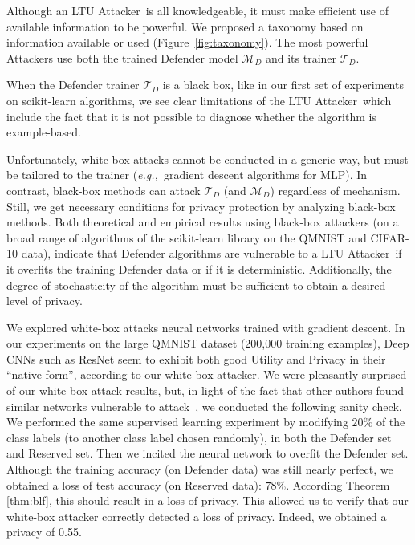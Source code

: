 \documentclass[letterpaper]{article}
\newcommand{\eg}{{\em e.g.,~}}
\newcommand{\oracle}{LTU Attacker~}
\begin{document}
Although an \oracle is all knowledgeable, it must make efficient use of available information to be powerful. We proposed a taxonomy
based on information available or used (Figure~\ref{fig:taxonomy}). The most powerful Attackers use both the trained Defender model $\mathcal{M}_D$ and its trainer $\mathcal{T}_D$.

When the Defender trainer $\mathcal{T}_D$ is a black box, like in our first set of experiments on scikit-learn algorithms, we see clear limitations of the \oracle which include the fact that it is not possible to diagnose whether the algorithm is example-based.

Unfortunately, white-box attacks cannot be conducted in a generic way, but must be tailored to the trainer (\eg  gradient descent algorithms for MLP). In contrast, black-box methods can attack $\mathcal{T}_D$ (and $\mathcal{M}_D$) regardless of mechanism. Still, we get necessary conditions for privacy protection by analyzing black-box methods. Both theoretical and empirical results using black-box attackers (on a broad range of algorithms of the scikit-learn library on the QMNIST and CIFAR-10 data),
indicate that Defender algorithms are vulnerable to a \oracle if it overfits the training Defender data or if it is deterministic. Additionally, the degree of stochasticity of the algorithm must be sufficient to obtain a desired level of privacy.

We explored white-box attacks neural networks trained with gradient descent. In our experiments on the large QMNIST dataset (200,000 training examples),
Deep CNNs such as ResNet seem to exhibit both good Utility and Privacy in their ``native form'', according to our white-box attacker.
We were pleasantly surprised of our white box attack results, but, in light of the fact that other authors found similar networks vulnerable to attack~\cite{nasr2019comprehensive}, we conducted the following sanity check.
We performed the same supervised learning experiment by modifying \(20\%\) of the class labels (to another class label chosen randomly), in both the Defender set and Reserved set. Then we incited the neural network to overfit the Defender set. Although the training accuracy (on Defender data) was still nearly perfect, we obtained a loss of test accuracy (on Reserved data): $78\%$. According Theorem \ref{thm:blf}, this should result in a loss of privacy. This allowed us to verify that our white-box attacker correctly detected a loss of privacy. Indeed, we obtained a privacy of 0.55.
\end{document}
